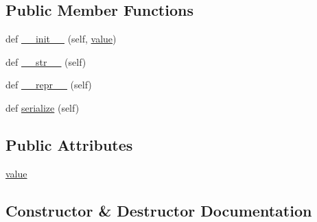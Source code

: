 \subsection*{Public Member Functions}
\begin{DoxyCompactItemize}
\item 
def \hyperlink{classpkg__resources_1_1__vendor_1_1packaging_1_1markers_1_1Node_a49178b86d635d213273db1e31421238b}{\+\_\+\+\_\+init\+\_\+\+\_\+} (self, \hyperlink{classpkg__resources_1_1__vendor_1_1packaging_1_1markers_1_1Node_a6b179c89dbc2c065efc7fe3adef11bd1}{value})
\item 
def \hyperlink{classpkg__resources_1_1__vendor_1_1packaging_1_1markers_1_1Node_aa82169b9f6c8bc1fc27ef9764b76bc0c}{\+\_\+\+\_\+str\+\_\+\+\_\+} (self)
\item 
def \hyperlink{classpkg__resources_1_1__vendor_1_1packaging_1_1markers_1_1Node_ac62e07ff6a24db5a4b5958ec29ebf07e}{\+\_\+\+\_\+repr\+\_\+\+\_\+} (self)
\item 
def \hyperlink{classpkg__resources_1_1__vendor_1_1packaging_1_1markers_1_1Node_ae6c70ae287780c19058df0af9f25b573}{serialize} (self)
\end{DoxyCompactItemize}
\subsection*{Public Attributes}
\begin{DoxyCompactItemize}
\item 
\hyperlink{classpkg__resources_1_1__vendor_1_1packaging_1_1markers_1_1Node_a6b179c89dbc2c065efc7fe3adef11bd1}{value}
\end{DoxyCompactItemize}


\subsection{Constructor \& Destructor Documentation}
\mbox{\label{classpkg__resources_1_1__vendor_1_1packaging_1_1markers_1_1Node_a49178b86d635d213273db1e31421238b}} 
